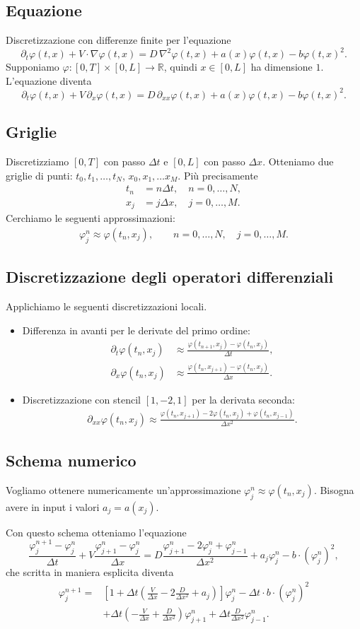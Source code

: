 \documentclass [11pt]{article}
\renewcommand{\phi}{\varphi}
\newcommand{\tonde}[1]{\left( #1 \right)}
\newcommand{\quadre}[1]{\left[ #1 \right]}
\newcommand{\R}{\mathbb{R}}
\theoremstyle{definition}
\theoremstyle{definition}
\newcommand{ \sss }[1]{\subsection*{#1}}
\begin{document}
\sss{Equazione}
%
Discretizzazione con differenze finite per l'equazione
%
$$
	\partial_t \phi(t,x)+V\cdot \nabla \phi(t,x)=D\,\nabla^2 \phi(t,x) + 						a(x)\phi(t,x)-b\phi(t,x)^2.
$$	
%
Supponiamo $\phi:[0,T]\times [0,L]\to \R$, quindi $x\in[0,L]$ ha dimensione $1$. L'equazione diventa
%
$$
\partial_t \phi(t,x)+V\,\partial_x \phi(t,x)=D\,\partial_{xx} \phi(t,x) + 						a(x)\phi(t,x)-b\phi(t,x)^2.
$$	




\sss{Griglie}

Discretizziamo $[0,T]$ con passo $\Delta t$ e $[0,L]$	con passo $\Delta x$. Otteniamo due griglie di punti: $t_0,t_1,\dots,t_N$, $x_0,x_1,\dots x_M$. Più precisamente
%
\begin{align*}
	t_n&=n\Delta t,\quad n=0,\dots,N,\\ 
	x_j&=j\Delta x,\quad j=0,\dots,M.
\end{align*}
%	
Cerchiamo le seguenti approssimazioni:
%
\begin{align*}
\phi^n_j\approx \phi(t_n,x_j),\qquad n=0,\dots,N,\quad  j=0,\dots,M.	
\end{align*}	
%



\sss{Discretizzazione degli operatori differenziali}
Applichiamo le seguenti discretizzazioni locali.
\begin{itemize}
%	
	\item Differenza in avanti per le derivate del primo ordine:
%
	\begin{align*}
		\partial_t\phi (t_n,x_j)&\approx \frac{\phi(t_{n+1},x_j)-\phi(t_n,x_j) }{\Delta t},\\
		\partial_x\phi (t_n,x_j)&\approx \frac{\phi(t_n,x_{j+1})-\phi(t_n,x_j) }{\Delta x}.
	\end{align*}
%
	\item Discretizzazione con stencil $[1,-2,1]$ per la derivata seconda:
%
	\begin{align*}
	\partial_{xx}\phi(t_n,x_j)\approx \frac{\phi(t_n,x_{j+1})-2\phi(t_n,x_j)+\phi(t_n,x_{j-1})}{\Delta x^2}.
	\end{align*}
%	
\end{itemize}
%

\newpage

\sss{Schema numerico}



Vogliamo ottenere numericamente un'approssimazione $\phi^n_j\approx \phi(t_n,x_j)$. Bisogna avere in input i valori
$a_j=a(x_j)$.

%
Con questo schema otteniamo l'equazione
%
$$
\frac{\phi^{n+1}_j-\phi^n_j }{\Delta t}+V\frac{\phi^n_{j+1}-\phi^n_j }{\Delta x}=
D\frac{\phi^n_{j+1}-2\phi^n_j+\phi^n_{j-1}}{\Delta x^2}+a_j\phi^n_j-b\cdot (\phi^n_j)^2,
$$
%
che scritta in maniera esplicita diventa
%
\begin{align*}
\phi^{n+1}_j=&\quadre{ 1+\Delta t\tonde{ \frac{V}{\Delta x}-2\frac{D}{\Delta x^2}+a_j } }\phi^n_j-\Delta t\cdot b\cdot (\phi^n_j)^2\\
&+\Delta t\tonde{ -\frac{V}{\Delta x}+\frac{D}{\Delta x^2} }\phi_{j+1}^n+\Delta t\frac{D}{\Delta x^2}\phi^n_{j-1}.
\end{align*}
\end{document}
